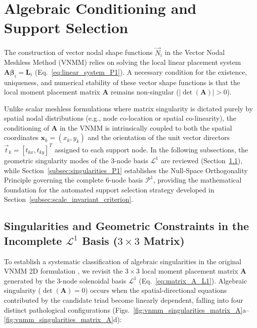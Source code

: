 \documentclass[preprint,12pt]{elsarticle}
\begin{document}
\section{Algebraic Conditioning and Support Selection}
\label{sec:conditioning}

The construction of vector nodal shape functions $\vec{N}_i$ in the Vector Nodal Meshless Method (VNMM) relies on solving the local linear placement system $\mathbf{A} \boldsymbol{\beta}_i = \mathbf{L}_i$ (Eq.~\eqref{eq:linear_system_P1}). A necessary condition for the existence, uniqueness, and numerical stability of these vector shape functions is that the local moment placement matrix $\mathbf{A}$ remains non-singular ($|\det(\mathbf{A})| > 0$).

Unlike scalar meshless formulations where matrix singularity is dictated purely by spatial nodal distributions (e.g., node co-location or spatial co-linearity), the conditioning of $\mathbf{A}$ in the VNMM is intrinsically coupled to both the spatial coordinates $\mathbf{x}_k = (x_k, y_k)$ and the orientation of the unit vector directors $\vec{t}_k = [t_{kx}, t_{ky}]^T$ assigned to each support node. In the following subsections, the geometric singularity modes of the 3-node basis $\mathcal{L}^1$ are reviewed (Section~\ref{subsec:singularities_L1}), while Section~\ref{subsec:singularities_P1} establishes the Null-Space Orthogonality Principle governing the complete 6-node basis $\mathcal{P}^1$, providing the mathematical foundation for the automated support selection strategy developed in Section~\ref{subsec:scale_invariant_criterion}.


\subsection{Singularities and Geometric Constraints in the Incomplete \texorpdfstring{$\mathcal{L}^1$}{L1} Basis (\texorpdfstring{$3 \times 3$}{3x3} Matrix)}
\label{subsec:singularities_L1}

To establish a systematic classification of algebraic singularities in the original VNMM 2D formulation \cite{ortiz2021nodal, ortiz2023tese}, we revisit the $3 \times 3$ local moment placement matrix $\mathbf{A}$ generated by the 3-node solenoidal basis $\mathcal{L}^1$ (Eq.~\eqref{eq:matrix_A_L1}). Algebraic singularity ($\det(\mathbf{A}) = 0$) occurs when the spatial-directional equations contributed by the candidate triad become linearly dependent, falling into four distinct pathological configurations (Figs.~\ref{fig:vnmm_singularities_matrix_A}a--\ref{fig:vnmm_singularities_matrix_A}d):
\end{document}
